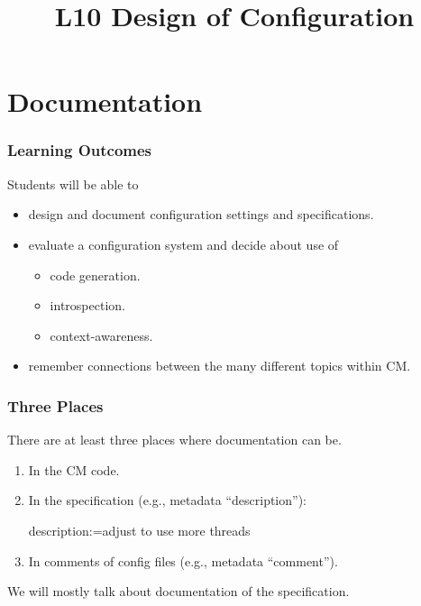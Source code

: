 

\title{L10 Design of Configuration}



\section{Documentation}

\begin{frame}
	\frametitle{Learning Outcomes}
	Students will be able to

	\begin{itemize}
	\item design and document configuration settings and specifications.
	\item evaluate a configuration system and decide about use of
	\begin{itemize}
	\item code generation.
	\item introspection.
	\item context-awareness.
	\end{itemize}
	\item remember connections between the many different topics within CM.
	\end{itemize}
\end{frame}

\begin{frame}[fragile]
	\frametitle{Three Places}

	There are at least three places where documentation can be.

	\begin{enumerate}
	\item In the CM code.
	\item In the specification (e.g., metadata ``description''):
	\begin{code}
	  description:=adjust to use more threads
	\end{code}
	\item In comments of config files (e.g., metadata ``comment'').
	\end{enumerate}

	\vspace{1cm}

	We will mostly talk about documentation of the specification.
\end{frame}


\begin{frame}
\end{frame}

